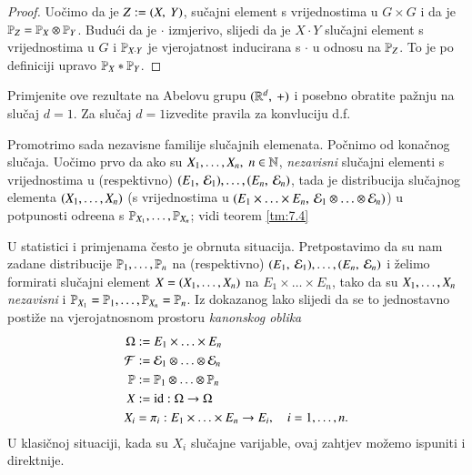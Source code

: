 \begin{proof}
    Uo\v cimo da je $Z:= ({X}, \: {Y})$, su\v cajni element s vrijednostima u $G \times G$ i da je $\mathbb{P}_Z = \mathbb{P}_X \otimes \mathbb{P}_Y$.
    Budu\' ci da je $\cdot$ izmjerivo, slijedi da je $X \cdot Y$ slu\v cajni element s vrijednostima u $G$ i $\mathbb{P}_{X \cdot Y}$ je vjerojatnost inducirana s $\cdot$ u odnosu na $\mathbb{P}_Z$.
    To je po definiciji upravo
    $\mathbb{P}_X * \mathbb{P}_Y$.
\end{proof}

\begin{zad} \label{zad:7.16}
    Primjenite ove rezultate na Abelovu grupu $({\mathbb{R}^d}, \: {+})$ i posebno obratite pa\v znju na slu\v caj $d = 1$.
    Za slu\v caj $d = 1$izvedite pravila za konvluciju d.f.
\end{zad}

Promotrimo sada nezavisne familije slu\v cajnih elemenata.
Po\v cnimo od kona\v cnog slu\v caja.
Uo\v cimo prvo da ako su ${X}_1, \ldots, {X}_n, \; n \in \mathbb{N}$, \emph{nezavisni} slu\v cajni elementi s vrijednostima u (respektivno) $({E_1}, \: {\mathcal{E}_1}), \ldots, ({E_n}, \: {\mathcal{E}_n})$, tada je distribucija slu\v cajnog elementa $({X}_1, \ldots, {X}_n)$ (s vrijednostima u $({E_1 \times \ldots \times E_n}, \: {\mathcal{E}_1 \otimes \ldots \otimes \mathcal{E}_n})$) u potpunosti odre\dj ena s $\mathbb{P}_{X_1}, \ldots, \mathbb{P}_{X_n}$; vidi teorem \ref{tm:7.4}

U statistici i primjenama \v cesto je obrnuta situacija.
Pretpostavimo da su nam zadane distribucije ${\mathbb{P}}_1, \ldots, {\mathbb{P}}_n$ na (respektivno) $({E_1}, \: {\mathcal{E}_1}), \ldots, ({E_n}, \: {\mathcal{E}_n})$ i \v zelimo formirati slu\v cajni element $X = ({X}_1, \ldots, {X}_n)$ na $E_1 \times \ldots \times E_n$, tako da su ${X}_1, \ldots, {X}_n$ \emph{nezavisni} i $\mathbb{P}_{X_1} = \mathbb{P}_1, \ldots, \mathbb{P}_{X_n} = \mathbb{P}_n$.
Iz dokazanog lako slijedi da se to jednostavno posti\v ze na vjerojatnosnom prostoru \emph{kanonskog oblika}
\begin{equation} \label{jed:7.17}
    \begin{aligned}
        \Omega &:= E_1 \times \ldots \times E_n\\
        \mathcal{F} &:= \mathcal{E}_1 \otimes \ldots \otimes \mathcal{E}_n\\
        \mathbb{P} &:= \mathbb{P}_1 \otimes \ldots \otimes \mathbb{P}_n\\
        X &:= \mathrm{id} : \Omega \to \Omega\\
        X_i &= \pi_i : E_1 \times \ldots \times E_n \to E_i, \quad i = 1, \ldots, n.
    \end{aligned}
\end{equation}
U klasi\v cnoj situaciji, kada su $X_i$ slu\v cajne varijable, ovaj zahtjev mo\v zemo ispuniti i direktnije.

